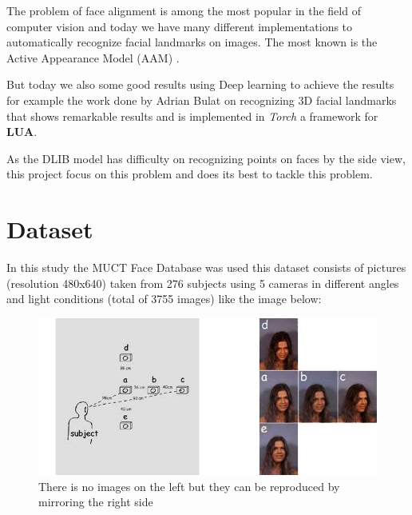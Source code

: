 \documentclass[11pt]{article}
\begin{document}
The problem of face alignment is among the most popular in the field of
computer vision and today we have many different implementations to
automatically recognize facial landmarks on images.
The most known is the Active Appearance Model (AAM)
\cite{edwards1998face,matthews2004active}.

But today we also some good results using Deep learning to achieve the
results for example the work done by Adrian Bulat on recognizing 3D facial
landmarks \cite{bulat2017far} that shows remarkable results and is implemented
in \emph{Torch} a framework for \textbf{LUA}. 

As the DLIB model has difficulty on recognizing points on faces by the side
view, this project focus on this problem and does its best to tackle this
problem.


\section{Dataset}
\label{sec:orgdbf23f6}
In this study the MUCT Face Database \cite{Milborrow10} was used
this dataset consists of pictures (resolution 480x640) taken from 276 subjects
using 5 cameras in different angles and light conditions (total of 3755
images) like the image below: 

\begin{figure}[htbp]
\centering
\includegraphics[width=.9\linewidth]{./images/muct-views-lores.jpg}
\caption{There is no images on the left but they can be reproduced by mirroring the right side}
\end{figure}
\end{document}
